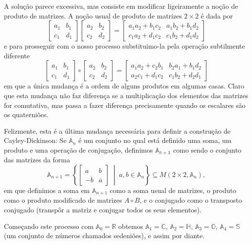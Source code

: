 \documentclass{article}
\newcommand{\R}{\mathbb{R}}
\newcommand{\C}{\mathbb{C}}
\renewcommand{\H}{\mathbb{H}}
\renewcommand{\O}{\mathbb{O}}
\begin{document}
A solução parece excessiva, mas consiste em modificar ligeiramente a noção de produto de matrizes. A noção usual de produto de matrizes $2 \times 2$ é dada por
\[\begin{bmatrix} a_1 & b_1 \\ c_1 & d_1 \end{bmatrix} \begin{bmatrix} a_2 & b_2 \\ c_2 & d_2 \end{bmatrix} = \begin{bmatrix} a_1 a_2 + b_1 c_2 & a_1 b_2 + b_1 d_2  \\ c_1 a_2 + d_1 c_2 & c_1 b_2 + d_1 d_2 \end{bmatrix}\]
e para prosseguir com o nosso processo substituimo-la pela operação subtilmente diferente
\[\begin{bmatrix} a_1 & b_1 \\ c_1 & d_1 \end{bmatrix} \circ \begin{bmatrix} a_2 & b_2 \\ c_2 & d_2 \end{bmatrix} = \begin{bmatrix} a_1 a_2 + c_2 b_1 & b_2 a_1 + b_1 d_2  \\ a_2 c_1 + d_1 c_2 & c_1 b_2 + d_2 d_1 \end{bmatrix}\]
em que a única mudança é a ordem de alguns produtos em algumas casas. Claro que esta mudança não faz diferença se a multiplicação dos elementos das matrizes for comutativa, mas passa a fazer diferença precisamente quando os escalares são os quaterniões.

Felizmente, esta é a última mudança necessária para definir a construção de Cayley-Dickinson: Se $\mathbb{A}_n$ é um conjunto no qual está definido uma soma, um produto e uma operação de conjugação, definimos $\mathbb{A_{n+1}}$ como sendo o conjunto das matrizes da forma
\[\mathbb{A}_{n+1} = \left\{ \begin{bmatrix} a & b \\ -\overline{b} & \overline{a} \end{bmatrix} \;\middle|\; a, b \in \mathbb{A}_n \right\} \subseteq M(2 \times 2, \mathbb{A}_n),\]
em que definimos a soma em $\mathbb{A}_{n+1}$ como a soma usual de matrizes, o produto como o produto modificado de matrizes $A \circ B$, e o conjugado como o transposto conjugado (transpôr a matriz e conjugar todos os seus elementos).

Começando este processo com $\mathbb{A}_0 = \R$ obtemos $\mathbb{A}_1 = \C$, $\mathbb{A}_2 = \H$, $\mathbb{A}_3 = \O$, $\mathbb{A}_4 = \mathbb{S}$ (um conjunto de números chamados sedeniões), e assim por diante.
\end{document}
